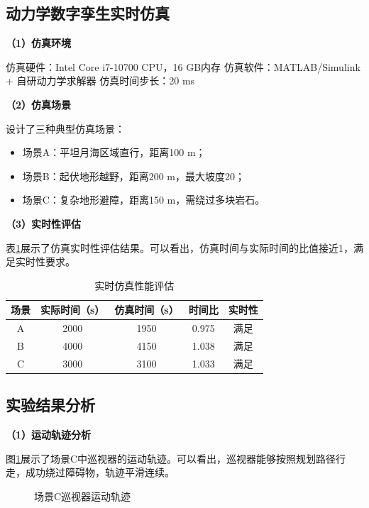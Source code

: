 \subsection{动力学数字孪生实时仿真}
\label{subsec:realtime_sim}

\textbf{（1）仿真环境}

仿真硬件：Intel Core i7-10700 CPU，16 GB内存
仿真软件：MATLAB/Simulink + 自研动力学求解器
仿真时间步长：20 ms

\textbf{（2）仿真场景}

设计了三种典型仿真场景：
\begin{itemize}
    \item 场景A：平坦月海区域直行，距离100 m；
    \item 场景B：起伏地形越野，距离200 m，最大坡度20\degree；
    \item 场景C：复杂地形避障，距离150 m，需绕过多块岩石。
\end{itemize}

\textbf{（3）实时性评估}

表\ref{tab:realtime}展示了仿真实时性评估结果。可以看出，仿真时间与实际时间的比值接近1，满足实时性要求。

\begin{table}[htbp]
    \centering
    \caption{实时仿真性能评估}
    \label{tab:realtime}
    \begin{tabular}{ccccc}
        \toprule
        场景 & 实际时间（s） & 仿真时间（s） & 时间比 & 实时性 \\
        \midrule
        A & 2000 & 1950 & 0.975 & 满足 \\
        B & 4000 & 4150 & 1.038 & 满足 \\
        C & 3000 & 3100 & 1.033 & 满足 \\
        \bottomrule
    \end{tabular}
\end{table}

\subsection{实验结果分析}
\label{subsec:dyn_results}

\textbf{（1）运动轨迹分析}

图\ref{fig:trajectory}展示了场景C中巡视器的运动轨迹。可以看出，巡视器能够按照规划路径行走，成功绕过障碍物，轨迹平滑连续。

\begin{figure}[htbp]
    \centering
    \caption{场景C巡视器运动轨迹}
    \label{fig:trajectory}
\end{figure}

